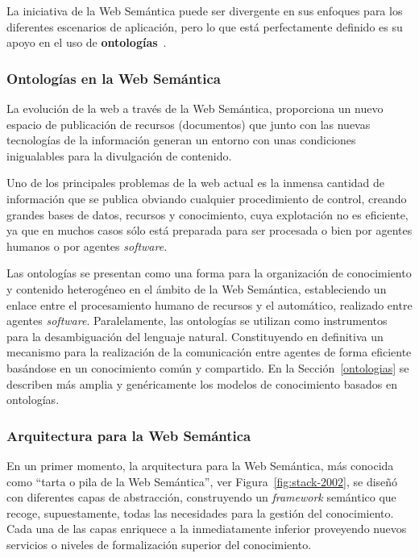 La iniciativa de la Web Semántica puede ser divergente en sus enfoques para los
diferentes escenarios de aplicación, pero lo que está perfectamente definido
es su apoyo en el uso de \textbf{ontologías}~\cite{Sowa99knowledge}. 

\subsubsection{Ontologías en la Web Semántica}
La evolución de la web a través de la Web Semántica, proporciona un nuevo
espacio de publicación de recursos (documentos) que junto con las nuevas tecnologías de
la información generan un entorno con unas condiciones inigualables para la
divulgación de contenido.

Uno de los principales problemas de la web actual es la inmensa cantidad de
información que se publica obviando cualquier procedimiento de control, creando
grandes bases de datos, recursos y conocimiento, cuya explotación no es eficiente, ya que
en muchos casos sólo está preparada para ser procesada o bien por agentes
humanos o por agentes \textit{software}.

Las ontologías se presentan como una forma para la organización de conocimiento
y contenido heterogéneo en el ámbito de la Web Semántica, estableciendo un enlace entre el procesamiento humano de recursos y el
automático, realizado entre agentes \textit{software}. Paralelamente, las ontologías se utilizan como
instrumentos para la desambiguación del lenguaje natural. Constituyendo en definitiva un mecanismo para 
la realización de la comunicación entre agentes de forma eficiente
basándose en un conocimiento común y compartido. En la Sección~\ref{ontologias} se describen más amplia y genéricamente los modelos de conocimiento basados en ontologías.

\subsubsection{Arquitectura para la Web Semántica}\label{sect:arch-ws}
En un primer momento, la arquitectura para la Web Semántica, más conocida como
``tarta o pila de la Web Semántica'', ver Figura~\ref{fig:stack-2002}, se diseñó con diferentes capas de abstracción, 
construyendo un \textit{framework} semántico que recoge, supuestamente, todas las necesidades para la gestión del
conocimiento. Cada una de las capas enriquece a la inmediatamente inferior
proveyendo nuevos servicios o niveles de formalización superior del conocimiento.


